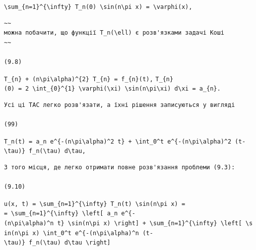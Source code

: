 \documentclass[
  ukrainian,
]{article}
\begin{document}
\texttt{\textbackslash{}sum\_\{n=1\}\^{}\{\textbackslash{}infty\}\ T\_n(0)\ \textbackslash{}sin(n\textbackslash{}pi\ x)\ =\ \textbackslash{}varphi(x),}

\begin{verbatim}
~~
можна побачити, що функції T_n(\ell) є розв'язками задачі Коші
~~

(9.8)
\end{verbatim}

\texttt{T\_\{n\}\ +\ (n\textbackslash{}pi\textbackslash{}alpha)\^{}\{2\}\ T\_\{n\}\ =\ f\_\{n\}(t),}
\texttt{T\_\{n\}(0)\ =\ 2\ \textbackslash{}int\_\{0\}\^{}\{1\}\ \textbackslash{}varphi(\textbackslash{}xi)\ \textbackslash{}sin(n\textbackslash{}pi\textbackslash{}xi)\ d\textbackslash{}xi\ =\ a\_\{n\}.}

\begin{verbatim}
Усі ці TAC легко розв'язати, а їхні рішення записуються у вигляді

(99)
\end{verbatim}

\texttt{T\_n(t)\ =\ a\_n\ e\^{}\{-(n\textbackslash{}pi\textbackslash{}alpha)\^{}2\ t\}\ +\ \textbackslash{}int\_0\^{}t\ e\^{}\{-(n\textbackslash{}pi\textbackslash{}alpha)\^{}2\ (t-\textbackslash{}tau)\}\ f\_n(\textbackslash{}tau)\ d\textbackslash{}tau,}

\begin{verbatim}
З того місця, де легко отримати повне розв'язання проблеми (9.3):

(9.10)
\end{verbatim}

\texttt{u(x,\ t)\ =\ \textbackslash{}sum\_\{n=1\}\^{}\{\textbackslash{}infty\}\ T\_n(t)\ \textbackslash{}sin(n\textbackslash{}pi\ x)\ =}
\texttt{=\ \textbackslash{}sum\_\{n=1\}\^{}\{\textbackslash{}infty\}\ \textbackslash{}left{[}\ a\_n\ e\^{}\{-(n\textbackslash{}pi\textbackslash{}alpha)\^{}n\ t\}\ \textbackslash{}sin(n\textbackslash{}pi\ x)\ \textbackslash{}right{]}\ +\ \textbackslash{}sum\_\{n=1\}\^{}\{\textbackslash{}infty\}\ \textbackslash{}left{[}\ \textbackslash{}sin(n\textbackslash{}pi\ x)\ \textbackslash{}int\_0\^{}t\ e\^{}\{-(n\textbackslash{}pi\textbackslash{}alpha)\^{}n\ (t-\textbackslash{}tau)\}\ f\_n(\textbackslash{}tau)\ d\textbackslash{}tau\ \textbackslash{}right{]}}
\end{document}
